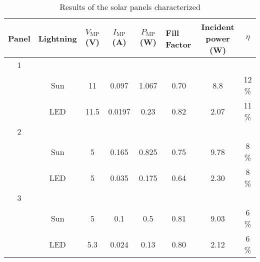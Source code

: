 \begin{table}[]
\centering
\begin{tabular}{cccccccc}
\hline
\textbf{Panel}              & \textbf{Lightning} & \textbf{$V_{\text{MP}}$ (V)} & \textbf{$I_{\text{MP}}$ (A)} & \textbf{$P_{\text{MP}}$ (W)} & \multicolumn{1}{l}{\textbf{Fill Factor}} & \textbf{Incident power (W)} & \textbf{$\eta$} \\ \hline
\multicolumn{1}{c|}{1} &                    &                              &                              &                              & \multicolumn{1}{l}{}                     &                             &                 \\
\multicolumn{1}{c|}{}  & Sun                & 11                           & 0.097                        & 1.067                        & 0.70                                     & 8.8                         & 12 \%           \\
\multicolumn{1}{c|}{}  & \acrshort{LED}     & 11.5                         & 0.0197                       & 0.23                         & 0.82                                     & 2.07                        & 11 \%           \\ \hline
\multicolumn{1}{c|}{2} &                    &                              &                              &                              &                                          &                             &                 \\
\multicolumn{1}{c|}{}  & Sun                & 5                            & 0.165                        & 0.825                        & 0.75                                     & 9.78                        & 8 \%            \\
\multicolumn{1}{c|}{}  & \acrshort{LED}     & 5                            & 0.035                        & 0.175                        & 0.64                                     & 2.30                        & 8 \%            \\ \hline
\multicolumn{1}{c|}{3} &                    &                              &                              &                              &                                          &                             &                 \\
\multicolumn{1}{c|}{}  & Sun                & 5                            & 0.1                          & 0.5                          & 0.81                                     & 9.03                        & 6 \%            \\
\multicolumn{1}{c|}{}  & \acrshort{LED}     & 5.3                          & 0.024                        & 0.13                         & 0.80                                     & 2.12                        & 6 \%            \\ \hline
\end{tabular}
\caption{Results of the solar panels characterized}
\label{tablepanel}
\end{table}

